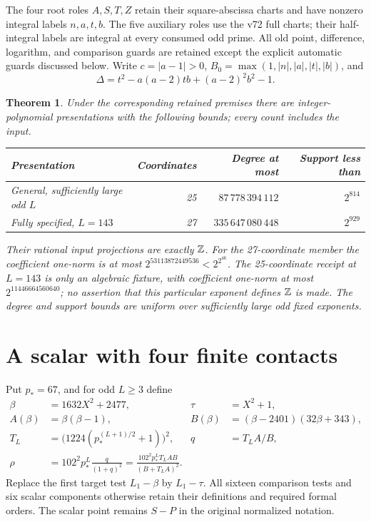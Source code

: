 \documentclass[11pt]{article}
\newtheorem{theorem}{Theorem}
\begin{document}
The four root roles $A,S,T,Z$ retain their square-abscissa charts and
have nonzero integral labels $n,a,t,b$. The five auxiliary roles use the
v72 full charts; their half-integral labels are integral at every consumed
odd prime. All old point, difference, logarithm, and comparison guards
are retained except the explicit automatic guards discussed below.
Write $c=|a-1|>0$, $B_0=\max(1,|n|,|a|,|t|,|b|)$, and
\[
 \Delta=t^2-a(a-2)tb+(a-2)^2b^2-1.
\]

\begin{theorem}\label{thm:main}
Under the corresponding retained premises there are integer-polynomial
presentations with the following bounds; every count includes the input.
\begin{center}\begin{tabular}{lrrr}
\toprule
Presentation&Coordinates&Degree at most&Support less than\\\midrule
General, sufficiently large odd $L$&25&$87\,778\,394\,112$&$2^{814}$\\
Fully specified, $L=143$&27&$335\,647\,080\,448$&$2^{929}$\\\bottomrule
\end{tabular}\end{center}
Their rational input projections are exactly $\mathbb Z$. For the 27-coordinate
member the coefficient one-norm is at most $2^{53113872449536}<2^{2^{46}}$.
The 25-coordinate receipt at $L=143$ is only an algebraic fixture, with
coefficient one-norm at most $2^{11446664560640}$; no assertion that this
particular exponent defines $\mathbb Z$ is made. The degree and support bounds
are uniform over sufficiently large odd fixed exponents.
\end{theorem}

\section{A scalar with four finite contacts}

Put $p_*=67$, and for odd $L\ge3$ define
\begin{align*}
 \beta&=1632X^2+2477,&\tau&=X^2+1,\\
 A(\beta)&=\beta(\beta-1),& B(\beta)&=(\beta-2401)(32\beta+343),\\
 T_L&=\bigl(1224(p_*^{(L+1)/2}+1)\bigr)^2,&q&=T_LA/B,\\
 \rho&=102^2p_*^L\frac{q}{(1+q)^2}
       =\frac{102^2p_*^LT_LAB}{(B+T_LA)^2}.
\end{align*}
Replace the first target test $L_1-\beta$ by $L_1-\tau$.
All sixteen comparison tests and six scalar components otherwise retain
their definitions and required formal orders. The scalar point remains
$S-P$ in the original normalized notation.
\end{document}
